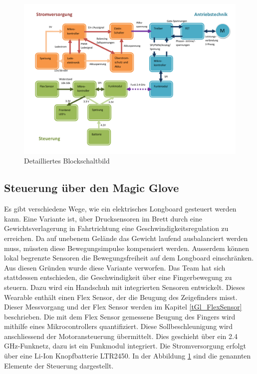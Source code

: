 
\begin{figure}[h]
	\centering
	\includegraphics[width=\linewidth]{images/Grobkonzept_Blockschaltbild_detailliert}
	\caption[Detailliertes Blockschaltbild]{Detailliertes Blockschaltbild}
	\label{fig:grobkonzeptblockschaltbilddetailliert}
\end{figure}

\subsection*{Steuerung über den Magic Glove}
Es gibt verschiedene Wege, wie ein elektrisches Longboard gesteuert werden kann. Eine Variante ist, über Drucksensoren im Brett durch eine Gewichtsverlagerung in Fahrtrichtung eine Geschwindigkeitsregulation zu erreichen. Da auf unebenem Gelände das Gewicht laufend ausbalanciert werden muss, müssten diese Bewegungsimpulse kompensiert werden. Ausserdem können lokal begrenzte Sensoren die Bewegungsfreiheit auf dem Longboard einschränken.
Aus diesen Gründen wurde diese Variante verworfen. Das Team hat sich stattdessen entschieden, die Geschwindigkeit über eine Fingerbewegung zu steuern. Dazu wird ein Handschuh mit integrierten Sensoren entwickelt. Dieses Wearable enthält einen Flex Sensor, der die Beugung des Zeigefinders misst. Dieser Messvorgang und der Flex Sensor werden im Kapitel \ref{tGl_FlexSensor} beschrieben. Die mit dem Flex Sensor gemessene Beugung des Fingers wird mithilfe eines Mikrocontrollers quantifiziert. Diese Sollbeschleunigung wird anschliessend der Motoransteuerung übermittelt. Dies geschieht über ein 2.4 GHz-Funknetz, dazu ist ein Funkmodul integriert. Die Stromversorgung erfolgt über eine Li-Ion Knopfbatterie LTR2450. In der Abbildung \ref{fig:grobkonzeptblockschaltbilddetailliert} sind die genannten Elemente der Steuerung dargestellt.

